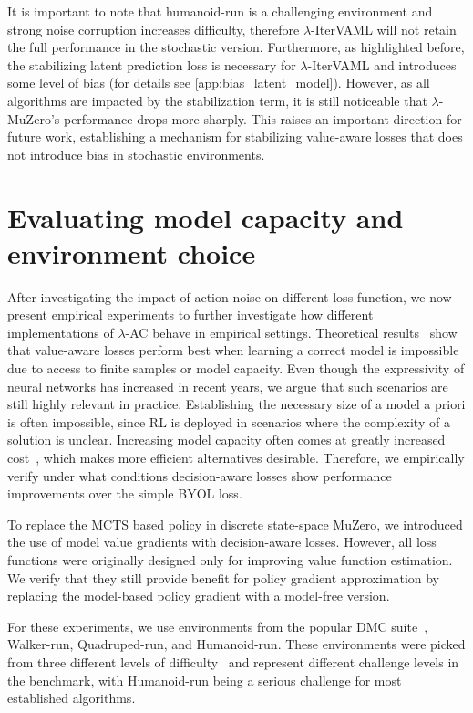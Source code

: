 It is important to note that humanoid-run is a challenging environment and strong noise corruption increases difficulty, therefore $\lambda$-IterVAML will not retain the full performance in the stochastic version.
Furthermore, as highlighted before, the stabilizing latent prediction loss is necessary for $\lambda$-IterVAML and introduces some level of bias (for details see \autoref{app:bias_latent_model}).
However, as all algorithms are impacted by the stabilization term, it is still noticeable that $\lambda$-MuZero's performance drops more sharply.
This raises an important direction for future work, establishing a mechanism for stabilizing value-aware losses that does not introduce bias in stochastic environments.

\section{Evaluating model capacity and environment choice}
\label{sec:experiments}

After investigating the impact of action noise on different loss function, we now present empirical experiments to further investigate how different implementations of $\lambda$-AC behave in empirical settings.
Theoretical results~\parencite{vaml,itervaml} show that value-aware losses perform best when learning a correct model is impossible due to access to finite samples or model capacity.
Even though the expressivity of neural networks has increased in recent years, we argue that such scenarios are still highly relevant in practice.
Establishing the necessary size of a model a priori is often impossible, since RL is deployed in scenarios where the complexity of a solution is unclear.
Increasing model capacity often comes at greatly increased cost~\parencite{kaplan2020scaling}, which makes more efficient alternatives desirable.
Therefore, we empirically verify under what conditions decision-aware losses show performance improvements over the simple BYOL loss.

To replace the MCTS based policy in discrete state-space MuZero, we introduced the use of model value gradients with decision-aware losses.
However, all loss functions were originally designed only for improving value function estimation.
We verify that they still provide benefit for policy gradient approximation by replacing the model-based policy gradient with a model-free version.

For these experiments, we use environments from the popular DMC suite~\parencite{tunyasuvunakool2020}, Walker-run, Quadruped-run, and Humanoid-run.
These environments were picked from three different levels of difficulty~\parencite{tdmpc} and represent different challenge levels in the benchmark, with Humanoid-run being a serious challenge for most established algorithms.

